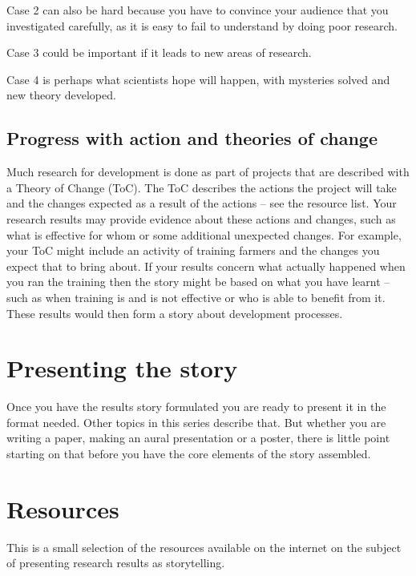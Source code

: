 \documentclass[
]{book}
\begin{document}
Case 2 can also be hard because you have to convince your audience that you investigated carefully, as it is easy to fail to understand by doing poor research.

Case 3 could be important if it leads to new areas of research.

Case 4 is perhaps what scientists hope will happen, with mysteries solved and new theory developed.

\hypertarget{progress-with-action-and-theories-of-change}{%
\subsection{Progress with action and theories of change}\label{progress-with-action-and-theories-of-change}}

Much research for development is done as part of projects that are described with a Theory of Change (ToC). The ToC describes the actions the project will take and the changes expected as a result of the actions -- see the resource list. Your research results may provide evidence about these actions and changes, such as what is effective for whom or some additional unexpected changes. For example, your ToC might include an activity of training farmers and the changes you expect that to bring about. If your results concern what actually happened when you ran the training then the story might be based on what you have learnt --such as when training is and is not effective or who is able to benefit from it. These results would then form a story about development processes.

\hypertarget{presenting-the-story}{%
\section{Presenting the story}\label{presenting-the-story}}

Once you have the results story formulated you are ready to present it in the format needed. Other topics in this series describe that. But whether you are writing a paper, making an aural presentation or a poster, there is little point starting on that before you have the core elements of the story assembled.

\hypertarget{resources}{%
\section{Resources}\label{resources}}

This is a small selection of the resources available on the internet on the subject of presenting research results as storytelling.
\end{document}
